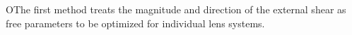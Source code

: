 OThe first method treats the magnitude and direction of the external shear as free parameters to be optimized for individual lens systems.